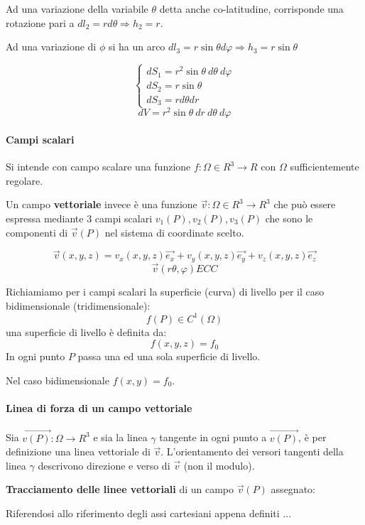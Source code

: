 Ad una variazione della variabile $\theta$ detta anche co-latitudine, corrisponde una rotazione
pari a $dl_2 = rd\theta \Rightarrow h_2 = r$.

Ad una variazione di $\phi$ si ha un arco $dl_3 = r\sin\theta d \varphi \Rightarrow h_3 = r\sin\theta$

$$\begin{cases}
dS_1 = r^2\sin\theta\ d\theta\ d\varphi \\
dS_2 = r \sin \theta \\
dS_3 = r d \theta dr
\end{cases}
$$
$$
dV = r^2 \sin\theta\ dr\ d\theta\ d\varphi
$$

\paragraph{Campi scalari}
Si intende con campo scalare una funzione $f:\Omega \in R^3 \to R$ con $\Omega$ sufficientemente 
regolare.

Un campo \textbf{vettoriale} invece è una funzione $\vec{v} : \Omega \in R^3 \to R^3$
che può essere espressa mediante 3 campi scalari $v_1(P),v_2(P),v_3(P)$ che sono le componenti di
$\vec{v}(P)$ nel sistema di coordinate scelto.

$$
\vec{v}(x,y,z) = v_x(x,y,z)\vec{e_x} + v_y(x,y,z)\vec{e_y} + v_z(x,y,z)\vec{e_z}
$$
$$
\vec{v}(r\theta,\varphi) ECC
$$

Richiamiamo per i campi scalari la superficie (curva) di livello per il caso bidimensionale 
(tridimensionale):
$$
f(P) \in C^1(\Omega)
$$
una superficie di livello è definita da:
$$
f(x,y,z) = f_0
$$
In ogni punto $P$ passa una ed una sola superficie di livello.

Nel caso bidimensionale $f(x,y) = f_0$.


\paragraph{Linea di forza di un campo vettoriale}
Sia $\vec{v(P)} : \Omega \to R^3$ e sia la linea $\gamma$ tangente in ogni punto a $\vec{v(P)}$,
è per definizione una linea vettoriale di $\vec{v}$.
L'orientamento dei versori tangenti della linea $\gamma$ descrivono direzione e verso di $\vec{v}$ 
(non il modulo).

\textbf{Tracciamento delle linee vettoriali} di un campo $\vec{v}(P)$ assegnato:

Riferendosi allo riferimento degli assi cartesiani appena definiti ...

